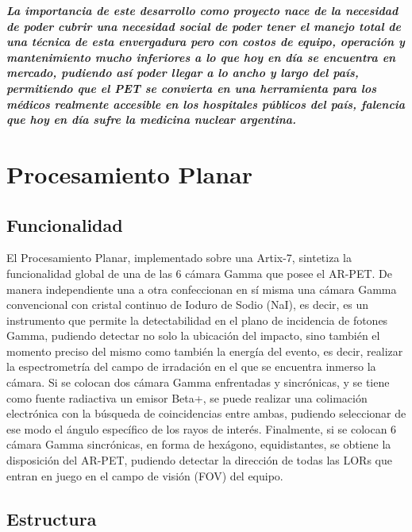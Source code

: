 \documentclass[conference]{IEEEtran}
\begin{document}
\textbf{\textit{La importancia de este desarrollo como proyecto nace de la necesidad de poder cubrir una necesidad social de poder tener el manejo total de una técnica de esta envergadura pero con costos de equipo, operación y mantenimiento mucho inferiores a lo que hoy en día se encuentra en mercado, pudiendo así poder llegar a lo ancho y largo del país, permitiendo que el PET se convierta en una herramienta para los médicos realmente accesible en los hospitales públicos del país, falencia que hoy en día sufre la medicina nuclear argentina.}}

\section{Procesamiento Planar}

\subsection{Funcionalidad}

El Procesamiento Planar, implementado sobre una Artix-7, sintetiza la funcionalidad global de una de las 6 cámara Gamma que posee el AR-PET. De manera independiente una a otra confeccionan en sí misma una cámara Gamma convencional con cristal continuo de Ioduro de Sodio (NaI), es decir, es un instrumento que permite la detectabilidad en el plano de incidencia de fotones Gamma, pudiendo detectar no solo la ubicación del impacto, sino también el momento preciso del mismo como también la energía del evento, es decir, realizar la espectrometría del campo de irradación en el que se encuentra inmerso la cámara.
Si se colocan dos cámara Gamma enfrentadas y sincrónicas, y se tiene como fuente radiactiva un emisor Beta+, se puede realizar una colimación electrónica con la búsqueda de coincidencias entre ambas, pudiendo seleccionar de ese modo el ángulo específico de los rayos de interés. 
Finalmente, si se colocan 6 cámara Gamma sincrónicas, en forma de hexágono, equidistantes, se obtiene la disposición del AR-PET, pudiendo detectar la dirección de todas las LORs que entran en juego en el campo de visión (FOV) del equipo.

\subsection{Estructura}
\end{document}
